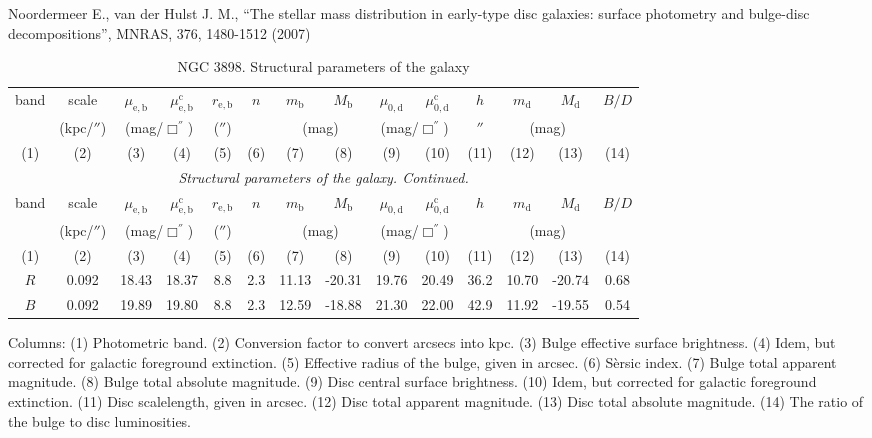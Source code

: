 \documentclass[english,10pt]{article}
\def\mm{\mathrm}
\begin{document}
\noindent
Noordermeer E., van der Hulst J. M., 
``The stellar mass distribution in early-type disc galaxies: surface
photometry and bulge-disc decompositions'', 
MNRAS, 376, 1480-1512 (2007)

\begin{longtable}[c]{cccccccccccccc}
\caption{NGC 3898. Structural parameters of the galaxy} \\ 
\hline 
band & scale & 
$\mu_\mm{e,b}$ & $\mu_\mm{e,b}^\mm{c}$ & $r_\mm{e,b}$ & 
$n$ & $m_\mm{b}$ & $M_\mm{b}$ & 
$\mu_\mm{0,d}$ & $\mu_\mm{0,d}^\mm{c}$ & $h$ & 
$m_\mm{d}$ & $M_\mm{d}$ & $B/D$ \\ 
& (kpc/$''$) & \multicolumn{2}{c}{(mag/$\Box^{''}$)} & ($''$) 
& & \multicolumn{2}{c}{(mag)} & 
\multicolumn{2}{c}{(mag/$\Box^{''}$)} & $''$ & 
\multicolumn{2}{c}{(mag)} & \\
(1)&(2)&(3)&(4)&(5)&(6)&(7)&(8)&(9)&(10)&(11)&(12)&(13)&(14) \\ 
\hline
\endfirsthead 
\hline
\multicolumn{14}{c}{\small\slshape Structural parameters of the galaxy. 
Continued. } \\ \hline
band & scale & 
$\mu_\mm{e,b}$ & $\mu_\mm{e,b}^\mm{c}$ & $r_\mm{e,b}$ & 
$n$ & $m_\mm{b}$ & $M_\mm{b}$ & 
$\mu_\mm{0,d}$ & $\mu_\mm{0,d}^\mm{c}$ & $h$ & 
$m_\mm{d}$ & $M_\mm{d}$ & $B/D$ \\ 
& (kpc/$''$) & \multicolumn{2}{c}{(mag/$\Box^{''}$)} & ($''$) 
& & \multicolumn{2}{c}{(mag)} & 
\multicolumn{2}{c}{(mag/$\Box^{''}$)} & & 
\multicolumn{2}{c}{(mag)} & \\
(1)&(2)&(3)&(4)&(5)&(6)&(7)&(8)&(9)&(10)&(11)&(12)&(13)&(14) \\
\hline
\endhead 
\hline
$R$ & 0.092 & 18.43 & 18.37 & 8.8 & 2.3 & 11.13 & -20.31 & 
19.76 & 20.49 & 36.2 & 10.70 & -20.74 & 0.68 \tabularnewline

$B$ & 0.092 & 19.89 & 19.80 & 8.8 & 2.3 & 12.59 & -18.88 & 
21.30 & 22.00 & 42.9 & 11.92 & -19.55 & 0.54 \tabularnewline
\hline
\end{longtable}

Columns: 
(1) Photometric band. 
(2) Conversion factor to convert arcsecs into kpc.
(3) Bulge effective surface brightness. 
(4) Idem, but corrected for galactic foreground extinction.
(5) Effective radius of the bulge, given in arcsec.
(6) S\`ersic index. 
(7) Bulge total apparent magnitude.
(8) Bulge total absolute magnitude.
(9) Disc central surface brightness. 
(10) Idem, but corrected for galactic foreground extinction.
(11) Disc scalelength, given in arcsec.
(12) Disc total apparent magnitude.
(13) Disc total absolute magnitude. 
(14) The ratio of the bulge to disc luminosities. 
\end{document}
